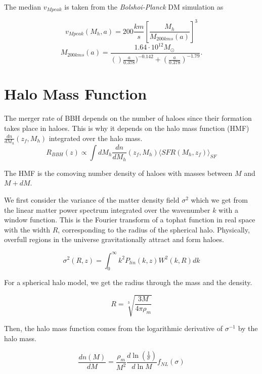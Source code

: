 The median $v_{Mpeak}$ is taken from the \textit{Bolshoi-Planck} DM simulation as

\begin{equation}
    v_{Mpeak}(M_h, a) = 200 \frac{km}{s}\left[ \frac{M_h}{M_{200kms}(a)}\right]^3
    \label{v_mpeak-M_h-relation}
\end{equation}
\begin{equation}
    M_{200kms}(a) = \frac{1.64 \cdot 10^{12} M_\odot\ }{()\frac{a}{0.378})^{-0.142}+(\frac{a}{0.378})^{-1.79}} .
\end{equation}

\section{Halo Mass Function}

The merger rate of BBH depends on the number of haloes since their formation takes place in haloes. This is why it depends on the halo mass function (HMF) $\frac{dn}{dM_h}(z_f, M_h)$ integrated over the halo mass. 
\begin{equation}
    R_{BBH}(z) \propto \int dM_h \frac{dn}{dM_h}(z_f, M_h)\langle SFR(M_h, z_f)\rangle_{SF}
\end{equation}

The HMF is the comoving number density of haloes with masses between $M$ and $M+dM$. 

We first consider the variance of the matter density field $\sigma^2$ which we get from the linear matter power spectrum integrated over the wavenumber $k$ with a window function. This is the Fourier transform of a tophat function in real space with the width $R$, corresponding to the radius of the spherical halo. Physically, overfull regions in the universe gravitationally attract and form haloes.

\begin{equation}
    \sigma^2(R, z) = \int_0^\infty k^2 P_{lin}(k, z) W^2(k, R) dk
\end{equation}

For a spherical halo model, we get the radius through the mass and the density.

\begin{equation}
    R= \sqrt[3]{\frac{3M}{4\pi \rho_m}}
\end{equation}

Then, the halo mass function comes from the logarithmic derivative of $\sigma^{-1}$ by the halo mass.

\begin{equation}
    \frac{dn(M)}{dM }=\frac{\rho_m}{M^2}\frac{d\ln (\frac{1}{\sigma})}{d\ln M}f_{NL}(\sigma)
\end{equation}

